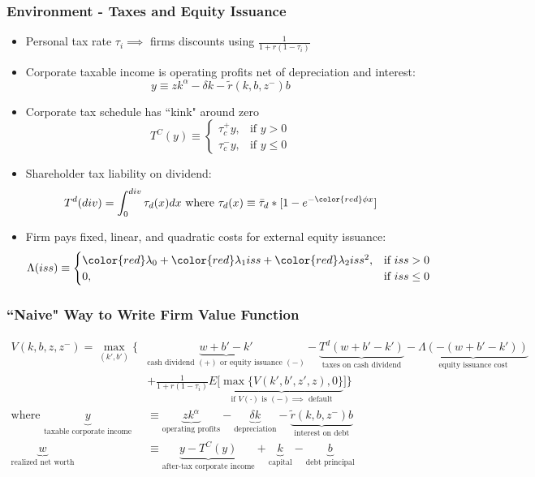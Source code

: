 \documentclass[usenames,dvipsnames, handout]{beamer}
\begin{document}
\begin{frame}
\frametitle{Environment - Taxes and Equity Issuance}
\small
\begin{itemize}
\item Personal tax rate $\tau_i \implies$ firms discounts using $\frac{1}{1 + r(1-\tau_i)}$
\item Corporate taxable income is operating profits net of depreciation and interest:
$$
y \equiv z k^\alpha - \delta k - \tilde r(k, b, z^-) b
$$
\item Corporate tax schedule has ``kink" around zero
$$
T^C(y) \equiv 
\begin{cases} 
\tau_c^+ y, & \text{if }y > 0 \\
\tau_c^- y, & \text{if }y \le 0
\end{cases}
$$
\item Shareholder tax liability on dividend:
$$
T^d(div) = \int_0^{div} \tau_d(x) dx \text{ where } \tau_d(x) \equiv \bar \tau_d * [1 - e^{-{\color{red}\phi} x}]
$$
\item Firm pays fixed, linear, and quadratic costs for external equity issuance:
$$
\Lambda(iss) \equiv 
\begin{cases} 
{\color{red}\lambda_0} + {\color{red}\lambda_1} iss + {\color{red}\lambda_2} iss^2, & \text{if }iss > 0 \\
0, & \text{if }iss \le 0
\end{cases}
$$
\end{itemize}
\end{frame}



\begin{frame}
\frametitle{``Naive" Way to Write Firm Value Function}
\scriptsize
\begin{align*}
V(k, b, z, z^-) =
\max_{(k', b')} \Bigg\{ 
& \underbrace{w + b' - k'}_{\text{cash dividend } (+) \text{ or equity issuance } (-)} - \underbrace{T^d(w + b' - k')}_{\text{taxes on cash dividend}} - \underbrace{\Lambda(-(w + b' - k'))}_{\text{equity issuance cost}} \\
&+ \frac{1}{1+r(1-\tau_i)} E\Big[\underbrace{\max\{ V(k', b', z', z), 0\}}_{\text{if }V(\cdot) \text{ is } (-) \implies\text{ default}}\Big] \Bigg\} \\
\text{where }
\underbrace{y}_{\text{taxable corporate income}} &\equiv \underbrace{z k^\alpha}_{\text{operating profits}} - \underbrace{\delta k}_{\text{depreciation}} - \underbrace{\tilde r(k, b, z^-) b}_{\text{interest on debt}} \\
\underbrace{w}_{\text{realized net worth}} &\equiv \underbrace{y - T^C(y)}_{\text{after-tax corporate income}}+ \underbrace{k}_{\text{capital}}  - \underbrace{b}_{\text{debt principal}} 
\end{align*}
\end{frame}
\end{document}
